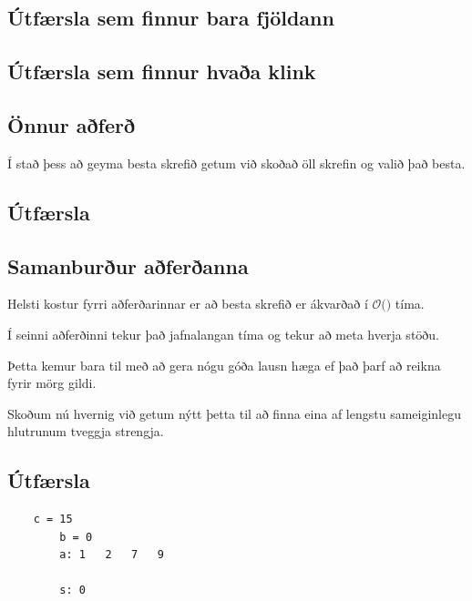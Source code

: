 \subsection{Útfærsla sem finnur bara fjöldann}
{
}

\subsection{Útfærsla sem finnur hvaða klink}
{
}

\subsection{Önnur aðferð}
{
    {
        \item<1-> Í stað þess að geyma besta skrefið getum við skoðað öll skrefin og valið það besta.
    }
}

\subsection{Útfærsla}
{
}

\subsection{Samanburður aðferðanna}
{
    {
        \item<1-> Helsti kostur fyrri aðferðarinnar er að besta skrefið er ákvarðað í $\mathcal{O}($$)$ tíma.
        \item<3-> Í seinni aðferðinni tekur það jafnalangan tíma og  tekur að meta hverja stöðu.
        \item<4-> Þetta kemur bara til með að gera nógu góða lausn hæga ef það þarf að reikna fyrir mörg gildi.
        \item<5-> Skoðum nú hvernig við getum nýtt þetta til að finna eina af lengstu sameiginlegu hlutrunum tveggja strengja.
    }
}

\subsection{Útfærsla}
{
}

{ \begin{verbatim}
    c = 15
        b = 0
        a: 1   2   7   9

        s: 0
        \end{verbatim} }

